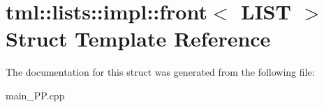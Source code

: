 \hypertarget{structtml_1_1lists_1_1impl_1_1front}{\section{tml\+:\+:lists\+:\+:impl\+:\+:front$<$ L\+I\+S\+T $>$ Struct Template Reference}
\label{structtml_1_1lists_1_1impl_1_1front}
}


The documentation for this struct was generated from the following file\+:\begin{DoxyCompactItemize}
\item 
main\+\_\+\+P\+P.\+cpp\end{DoxyCompactItemize}
